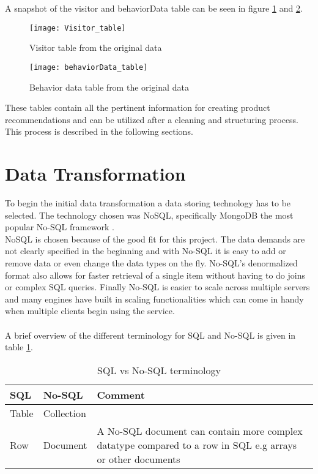 A snapshot of the visitor and behaviorData table can be seen in figure \ref{visitorTable} and \ref{behaviorTable}.

\begin{figure}[H]
\texttt{[image: Visitor\_table]}
\caption{Visitor table from the original data}
\label{visitorTable}
\end{figure}
\begin{figure}[H]
\texttt{[image: behaviorData\_table]}
\caption{Behavior data table from the original data}
\label{behaviorTable}
\end{figure}

These tables contain all the pertinent information for creating product recommendations and can be utilized after a cleaning and structuring process. This process is described in the following sections.

\section{Data Transformation}
To begin the initial data transformation a data storing technology has to be selected. The technology chosen was \gls{NoSQL}, specifically \gls{MongoDB} the most popular No-SQL framework \cite{DBRankings}. \\
\gls{NoSQL} is chosen because of the good fit for this project. The data demands are not clearly specified in the beginning and with No-SQL it is easy to add or remove data or even change the data types on the fly. No-SQL's denormalized format also allows for faster retrieval of a single item without having to do joins or complex SQL queries. Finally No-SQL is easier to scale across multiple servers and many engines have built in scaling functionalities \cite{SQLvsNOSQL} which can come in handy when multiple clients begin using the service. \\\\

A brief overview of the different terminology for SQL and No-SQL is given in table \ref{sqlvsnosql_table}.
\begin{table}[H]
\centering
\caption{SQL vs No-SQL terminology}
\label{sqlvsnosql_table}
\begin{tabular}{|l|l|p{8cm}|}
\hline
\textbf{SQL}   & \textbf{No-SQL}     & \textbf{Comment}                                                                                                    \\ \hline
Table & Collection &                                                                                                            \\ \hline
Row   & Document   & A No-SQL document can contain more complex datatype compared to a row in SQL e.g arrays or other documents \\
\hline
\end{tabular}
\end{table}

